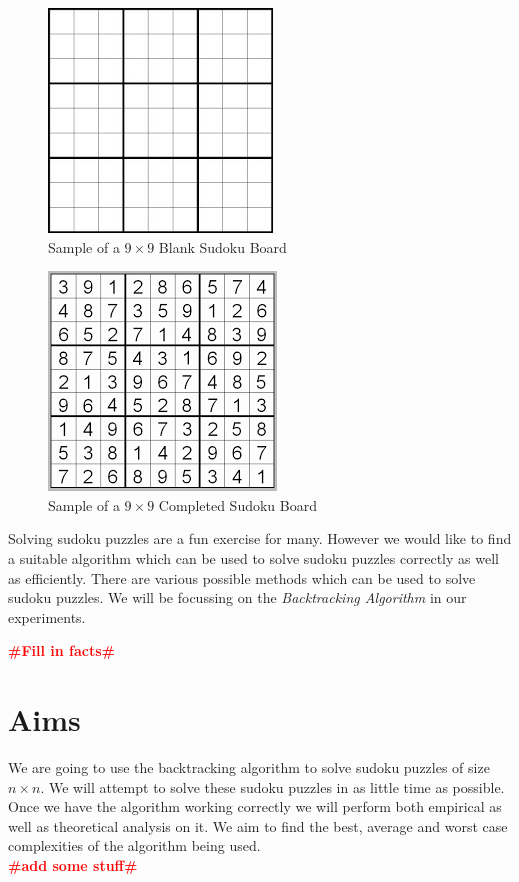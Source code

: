 \documentclass[12pt,a4paper,titlepage]{article}
\newcommand{\todo}[1]{\textcolor{red}{\textbf{\##1\#}}}
\begin{document}
\begin{figure}[h]
\centering
\includegraphics[scale=0.5]{Blank_Sudoku_Board}
\caption{Sample of a $9\times9$ Blank Sudoku Board}
\label{fig:Blank_Sudoku_Board}
\end{figure}
\begin{figure}[h]
\centering
\includegraphics[scale=0.5]{Complete_Sudoku_Board}
\caption{Sample of a $9\times9$ Completed Sudoku Board}
\label{fig:Complete_Sudoku_Board}
\end{figure}

Solving sudoku puzzles are a fun exercise for many. However we would like to find a suitable algorithm which can be used to solve sudoku puzzles correctly as well as efficiently. There are various possible methods which can be used to solve sudoku puzzles. We will be focussing on the \emph{Backtracking Algorithm} in our experiments.

\todo{Fill in facts}

\section{Aims}

We are going to use the backtracking algorithm to solve sudoku puzzles of size $n\times n$. We will attempt to solve these sudoku
puzzles in as little time as possible. Once we have the algorithm working correctly we will perform both empirical as well as
theoretical analysis on it. We aim to find the best, average and worst case complexities of the algorithm being used.
\\
\todo{add some stuff}
\end{document}
